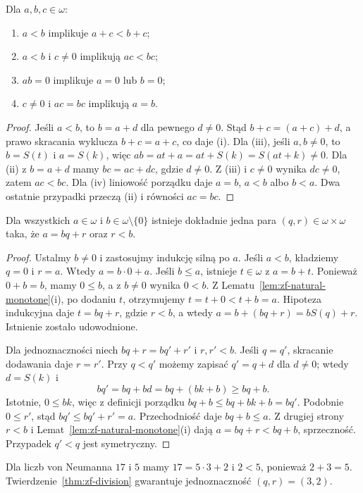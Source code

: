 \begin{lemat}
\label{lem:zf-natural-monotone}
Dla $a,b,c\in\omega$:
\begin{enumerate}[label=(\roman*)]
\item $a<b$ implikuje $a+c<b+c$;
\item $a<b$ i $c\ne0$ implikują $ac<bc$;
\item $ab=0$ implikuje $a=0$ lub $b=0$;
\item $c\ne0$ i $ac=bc$ implikują $a=b$.
\end{enumerate}
\end{lemat}
\begin{proof}
Jeśli $a<b$, to $b=a+d$ dla pewnego $d\ne0$.
Stąd $b+c=(a+c)+d$, a prawo skracania
wyklucza $b+c=a+c$, co daje (i).
Dla (iii), jeśli $a,b\ne0$,
to $b=S(t)$ i $a=S(k)$,
więc $ab=at+a=at+S(k)=S(at+k)\ne0$.
Dla (ii) z $b=a+d$ mamy
$bc=ac+dc$, gdzie $d\ne0$.
Z (iii) i $c\ne0$ wynika $dc\ne0$,
zatem $ac<bc$.
Dla (iv) liniowość porządku
daje $a=b$, $a<b$ albo $b<a$.
Dwa ostatnie przypadki przeczą (ii)
i równości $ac=bc$.
\end{proof}

\begin{twierdzenie}
\label{thm:zf-division}
Dla wszystkich $a\in\omega$ i
$b\in\omega\setminus\{0\}$
istnieje dokładnie jedna para
$(q,r)\in\omega\times\omega$
taka, że $a=bq+r$ oraz $r<b$.
\end{twierdzenie}
\begin{proof}
Ustalmy $b\ne0$ i zastosujmy indukcję silną
po $a$. Jeśli $a<b$, kładziemy
$q=0$ i $r=a$. Wtedy $a=b\cdot0+a$.
Jeśli $b\le a$, istnieje $t\in\omega$
z $a=b+t$. Ponieważ $0+b=b$,
mamy $0\le b$, a z $b\ne0$ wynika $0<b$.
Z Lematu~\ref{lem:zf-natural-monotone}(i),
po dodaniu $t$, otrzymujemy
$t=t+0<t+b=a$.
Hipoteza indukcyjna daje
$t=bq+r$, gdzie $r<b$,
a wtedy
$a=b+(bq+r)=bS(q)+r$.
Istnienie zostało udowodnione.

Dla jednoznaczności niech
$bq+r=bq'+r'$ i $r,r'<b$.
Jeśli $q=q'$, skracanie dodawania
daje $r=r'$. Przy $q<q'$
możemy zapisać $q'=q+d$
dla $d\ne0$; wtedy $d=S(k)$ i
\[
bq'=bq+bd=bq+(bk+b)\ge bq+b.
\]
Istotnie, $0\le bk$, więc z definicji porządku
$bq+b\le bq+bk+b=bq'$.
Podobnie $0\le r'$, stąd
$bq'\le bq'+r'=a$.
Przechodniość daje $bq+b\le a$.
Z drugiej strony $r<b$ i
Lemat~\ref{lem:zf-natural-monotone}(i)
dają $a=bq+r<bq+b$, sprzeczność.
Przypadek $q'<q$ jest symetryczny.
\end{proof}

\begin{przyklad}
\label{ex:zf-division}
Dla liczb von Neumanna $17$ i $5$
mamy $17=5\cdot3+2$ i $2<5$,
ponieważ $2+3=5$.
Twierdzenie~\ref{thm:zf-division}
gwarantuje jednoznaczność $(q,r)=(3,2)$.
\end{przyklad}

